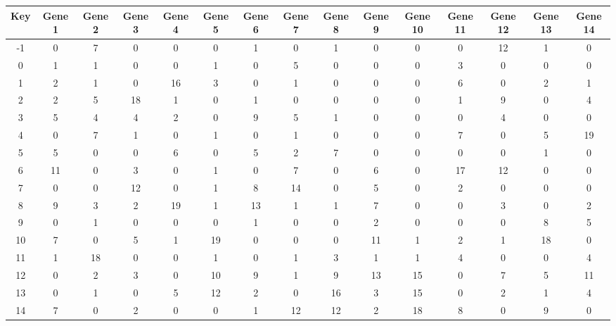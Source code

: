 \begin{tabular}{|c|c|c|c|c|c|c|c|c|c|c|c|c|c|c|}
\hline
Key & Gene 1 & Gene 2 & Gene 3 & Gene 4 & Gene 5 & Gene 6 & Gene 7 & Gene 8 & Gene 9 & Gene 10 & Gene 11 & Gene 12 & Gene 13 & Gene 14 \\
\hline
-1 & 0 & 7 & 0 & 0 & 0 & 1 & 0 & 1 & 0 & 0 & 0 & 12 & 1 & 0 \\
0 & 1 & 1 & 0 & 0 & 1 & 0 & 5 & 0 & 0 & 0 & 3 & 0 & 0 & 0 \\
1 & 2 & 1 & 0 & 16 & 3 & 0 & 1 & 0 & 0 & 0 & 6 & 0 & 2 & 1 \\
2 & 2 & 5 & 18 & 1 & 0 & 1 & 0 & 0 & 0 & 0 & 1 & 9 & 0 & 4 \\
3 & 5 & 4 & 4 & 2 & 0 & 9 & 5 & 1 & 0 & 0 & 0 & 4 & 0 & 0 \\
4 & 0 & 7 & 1 & 0 & 1 & 0 & 1 & 0 & 0 & 0 & 7 & 0 & 5 & 19 \\
5 & 5 & 0 & 0 & 6 & 0 & 5 & 2 & 7 & 0 & 0 & 0 & 0 & 1 & 0 \\
6 & 11 & 0 & 3 & 0 & 1 & 0 & 7 & 0 & 6 & 0 & 17 & 12 & 0 & 0 \\
7 & 0 & 0 & 12 & 0 & 1 & 8 & 14 & 0 & 5 & 0 & 2 & 0 & 0 & 0 \\
8 & 9 & 3 & 2 & 19 & 1 & 13 & 1 & 1 & 7 & 0 & 0 & 3 & 0 & 2 \\
9 & 0 & 1 & 0 & 0 & 0 & 1 & 0 & 0 & 2 & 0 & 0 & 0 & 8 & 5 \\
10 & 7 & 0 & 5 & 1 & 19 & 0 & 0 & 0 & 11 & 1 & 2 & 1 & 18 & 0 \\
11 & 1 & 18 & 0 & 0 & 1 & 0 & 1 & 3 & 1 & 1 & 4 & 0 & 0 & 4 \\
12 & 0 & 2 & 3 & 0 & 10 & 9 & 1 & 9 & 13 & 15 & 0 & 7 & 5 & 11 \\
13 & 0 & 1 & 0 & 5 & 12 & 2 & 0 & 16 & 3 & 15 & 0 & 2 & 1 & 4 \\
14 & 7 & 0 & 2 & 0 & 0 & 1 & 12 & 12 & 2 & 18 & 8 & 0 & 9 & 0 \\
\hline
\end{tabular}